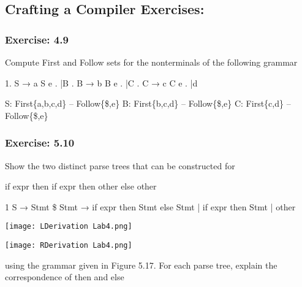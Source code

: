 \documentclass[letterpaper, 10pt,DIV=13]{scrartcl}
\numberwithin{equation}{section} %
\numberwithin{figure}{section} %
\numberwithin{table}{section} %
\begin{document}
\subsection*{Crafting a Compiler Exercises:}

\subsubsection*{Exercise: 4.9}
Compute First and Follow sets for the nonterminals of the following
grammar

    1. S → a S e .   |B . B → b B e .   |C . C → c C e .   |d \newline

    S: First\{a,b,c,d\} -- Follow\{\$,e\} \newline
    B: First\{b,c,d\} -- Follow\{\$,e\} \newline
    C: First\{c,d\} -- Follow\{\$,e\} \newline     
    
\subsubsection*{Exercise: 5.10}
Show the two distinct parse trees that can be constructed for \newline

if expr then if expr then other else other \newline

1 S → Stmt \$  Stmt → if expr then Stmt else Stmt       | if expr then Stmt       | other \newline

    \begin{center}
        \texttt{[image: LDerivation Lab4.png]}
    \end{center}

    \begin{center}
        \texttt{[image: RDerivation Lab4.png]}
    \end{center}

using the grammar given in Figure 5.17. For each parse tree, explain the correspondence of then and else \newline
\end{document}
